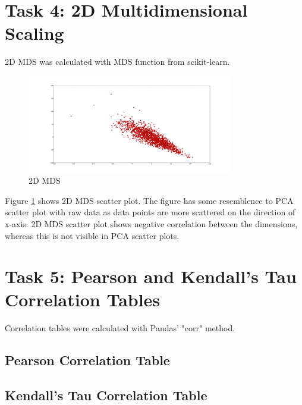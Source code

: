 \documentclass[12pt]{article}
\begin{document}
\section{Task 4: 2D Multidimensional Scaling}

2D MDS was calculated with MDS function from scikit-learn.

\begin{figure}[H]
    \centering
    \includegraphics[width=0.8\textwidth]{2d_mds}
    \caption{2D MDS}
    \label{fig:mds}
\end{figure}

Figure \ref{fig:mds} shows 2D MDS scatter plot. The figure has some resemblence to PCA scatter plot with raw data as data points are more scattered on the direction of x-axis. 2D MDS scatter plot shows negative correlation between the dimensions, whereas this is not visible in PCA scatter plots.

\section{Task 5: Pearson and Kendall's Tau Correlation Tables}

Correlation tables were calculated with Pandas' "corr" method.

\subsection{Pearson Correlation Table}

\resizebox{\linewidth}{!}{%



}

\subsection{Kendall's Tau Correlation Table}

\resizebox{\linewidth}{!}{%



}
\end{document}
